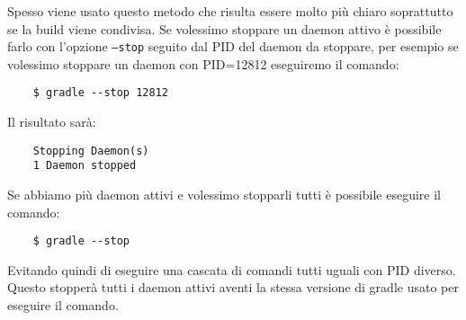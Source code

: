 Spesso viene usato questo metodo che risulta essere molto più chiaro soprattutto se la build viene condivisa. Se volessimo stoppare un daemon attivo è possibile farlo con l'opzione \texttt{--stop} seguito dal PID del daemon da stoppare, per esempio se volessimo stoppare un daemon con PID=12812 eseguiremo il comando:
\begin{verbatim}
    $ gradle --stop 12812\end{verbatim}
Il risultato sarà:
\begin{verbatim}
    Stopping Daemon(s)
    1 Daemon stopped\end{verbatim}
Se abbiamo più daemon attivi e volessimo stopparli tutti è possibile eseguire il comando:
\begin{verbatim}
    $ gradle --stop \end{verbatim}
Evitando quindi di eseguire una cascata di comandi tutti uguali con PID diverso. Questo stopperà tutti i daemon attivi aventi la stessa versione di gradle usato per eseguire il comando.